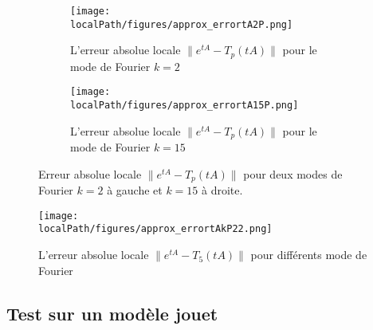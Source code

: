 \begin{figure}
  \begin{subfigure}{.5\textwidth}
    \centering
    \texttt{[image: \\localPath/figures/approx\_errortA2P.png]}
    \caption{L'erreur absolue locale $\|e^{tA}-T_p(tA)\|$ pour le mode de Fourier $k=2$}
  \end{subfigure}
  \begin{subfigure}{.5\textwidth}
    \centering
    \texttt{[image: \\localPath/figures/approx\_errortA15P.png]}
    \caption{L'erreur absolue locale $\|e^{tA}-T_p(tA)\|$ pour le mode de Fourier $k=15$}
  \end{subfigure}
  \caption{Erreur absolue locale $\|e^{tA}-T_p(tA)\|$ pour deux modes de Fourier $k=2$ à gauche et $k=15$ à droite.}
\end{figure}

\begin{figure}
  \centering
  \texttt{[image: \\localPath/figures/approx\_errortAkP22.png]}
  \caption{L'erreur absolue locale $\|e^{tA}-T_5(tA)\|$ pour différents mode de Fourier}
\end{figure}


\subsection{Test sur un modèle jouet}

